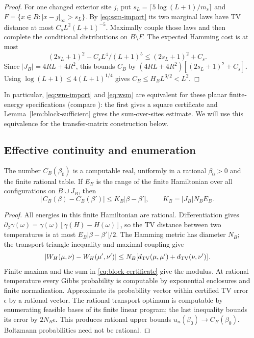 \begin{proof}
For one changed exterior site \(j\), put \(s_L=\lceil5\log(L+1)/m_s\rceil\) and \(F=\{x\in B:|x-j|_\infty>s_L\}\). By \eqref{eq:ssm-import} its two marginal laws have TV distance at most \(C_sL^2(L+1)^{-5}\). Maximally couple those laws and then complete the conditional distributions on \(B\setminus F\). The expected Hamming cost is at most
\[
(2s_L+1)^2+C_sL^4/(L+1)^5\le(2s_L+1)^2+C_s.
\]
Since \(|J_B|=4RL+4R^2\), this bounds \(C_B\) by \((4RL+4R^2)[(2s_L+1)^2+C_s]\). Using \(\log(L+1)\le4(L+1)^{1/4}\) gives \(C_B\le H_BL^{3/2}<L^2\).
\end{proof}

In particular, \eqref{eq:wm-import} and \eqref{eq:wsm} are equivalent for these planar finite-energy specifications (compare \cite[Theorem~3.2]{mos}): the first gives a square certificate and Lemma~\ref{lem:block-sufficient} gives the sum-over-sites estimate. We will use this equivalence for the transfer-matrix construction below.

\subsection{Effective continuity and enumeration}

\begin{lemma}\label{lem:block-effective}
The number \(C_B(\beta_0)\) is a computable real, uniformly in a rational \(\beta_0>0\) and the finite rational table. If \(E_B\) is the range of the finite Hamiltonian over all configurations on \(B\cup J_B\), then
\[
|C_B(\beta)-C_B(\beta')|\le K_B|\beta-\beta'|,
\qquad K_B=|J_B|N_BE_B.
\]
\end{lemma}

\begin{proof}
All energies in this finite Hamiltonian are rational. Differentiation gives
\(\partial_\beta\gamma(\omega)=\gamma(\omega)[\gamma(H)-H(\omega)]\), so the TV distance between two temperatures is at most \(E_B|\beta-\beta'|/2\). The Hamming metric has diameter \(N_B\); the transport triangle inequality and maximal coupling give
\[
|W_H(\mu,\nu)-W_H(\mu',\nu')|
\le N_B[d_{\mathrm{TV}}(\mu,\mu')+d_{\mathrm{TV}}(\nu,\nu')].
\]
Finite maxima and the sum in \eqref{eq:block-certificate} give the modulus. At rational temperature every Gibbs probability is computable by exponential enclosures and finite normalization. Approximate its probability vector within certified TV error \(\epsilon\) by a rational vector. The rational transport optimum is computable by enumerating feasible bases of its finite linear program; the last inequality bounds its error by \(2N_B\epsilon\). This produces rational upper bounds \(u_n(\beta_0)\to C_B(\beta_0)\). Boltzmann probabilities need not be rational.
\end{proof}


